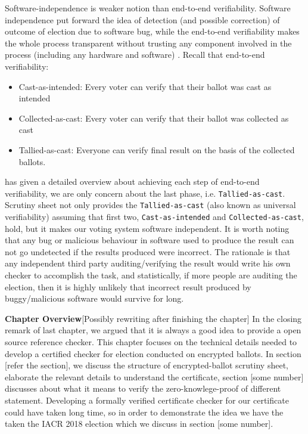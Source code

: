  
 Software-independence is weaker notion than  end-to-end verifiability. Software independence 
 put forward the idea of detection (and possible correction) of outcome of election due to 
 software bug, while the end-to-end verifiability makes the whole process transparent without trusting 
 any component involved in the process (including any hardware and software) \citep{Bernhard:2017:PES}.
 Recall that end-to-end verifiability:
  \begin{itemize}
  \item Cast-as-intended: Every voter can verify that their ballot was cast as
  intended
  \item Collected-as-cast: Every voter can verify that their ballot was collected as
  cast
  \item Tallied-as-cast: Everyone can verify final result on the basis of the
  collected ballots.
\end{itemize}


\cite{Benaloh:2006:SVE:1251003.1251008} has given a detailed overview  about achieving each step of 
end-to-end verifiability, we are only concern about the last phase, i.e. \texttt{Tallied-as-cast}.
Scrutiny sheet not only provides the \texttt{Tallied-as-cast}
(also known as universal verifiability) assuming that first two, \texttt{Cast-as-intended} and 
\texttt{Collected-as-cast}, hold, but it makes our voting system  software independent. 
It is worth noting that any bug or malicious behaviour in 
software used to produce the result can not go undetected if the results produced were incorrect. The 
rationale is that any independent third party auditing/verifying the result would
write his own checker to accomplish the task, and statistically, if more people are auditing the election, then 
it is highly unlikely that incorrect result produced by buggy/malicious software would survive for long. 



\textbf{Chapter Overview}[Possibly rewriting after finishing the chapter]
In the closing remark of last chapter, we argued that it is always a good idea to provide a open source 
reference checker. This chapter focuses on the technical details needed to develop a certified checker 
for election conducted on encrypted ballots. 
In section [refer the section], we discuss the structure of  encrypted-ballot scrutiny sheet, 
elaborate the relevant details to understand the certificate, section [some number] discusses 
about what it means to verify the zero-knowlege-proof of different statement. Developing a 
formally verified certificate checker for our certificate could have taken long time, so in order 
to demonstrate the idea we have the taken the IACR 2018 election which we discuss in section [some number].
%

